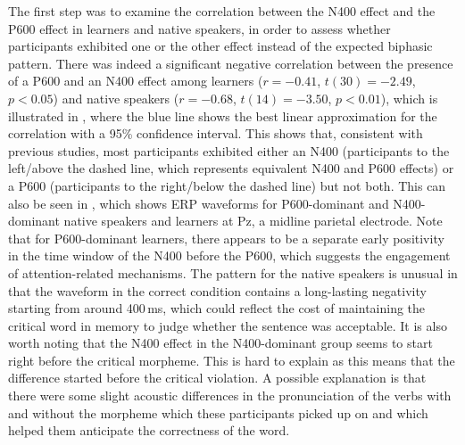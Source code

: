 \documentclass[output=paper,colorlinks,citecolor=brown,modfonts,nonflat]{../langscibook}
\begin{document}
The first step was to examine the correlation between the N400 effect and the P600 effect in learners and native speakers, in order to assess whether participants exhibited one or the other effect instead of the expected biphasic pattern. There was indeed a significant negative correlation between the presence of a P600 and an N400 effect among learners ($r = -0.41$, $t(30) = -2.49$, $p < 0.05$) and native speakers ($r = -0.68$, $t(14) = -3.50$, $p < 0.01$), which is illustrated in , where the blue line shows the best linear approximation for the correlation with a 95\% confidence interval. This shows that, consistent with previous studies, most participants exhibited either an N400 (participants to the left\slash above the dashed line, which represents equivalent N400 and P600 effects) or a P600 (participants to the right/below the dashed line) but not both. This can also be seen in , which shows ERP waveforms for P600-dominant and N400-dominant native speakers and learners at Pz, a midline parietal electrode. Note that for P600-dominant learners, there appears to be a separate early positivity in the time window of the N400 before the P600, which suggests the engagement of attention-related mechanisms. The pattern for the native speakers is unusual in that the waveform in the correct condition contains a long-lasting negativity starting from around 400\,ms, which could reflect the cost of maintaining the critical word in memory to judge whether the sentence was acceptable. It is also worth noting that the N400 effect in the N400-dominant group seems to start right before the critical morpheme. This is hard to explain as this means that the difference started before the critical violation. A possible explanation is that there were some slight acoustic differences in the pronunciation of the verbs with and without the morpheme which these participants picked up on and which helped them anticipate the correctness of the word.
\end{document}
